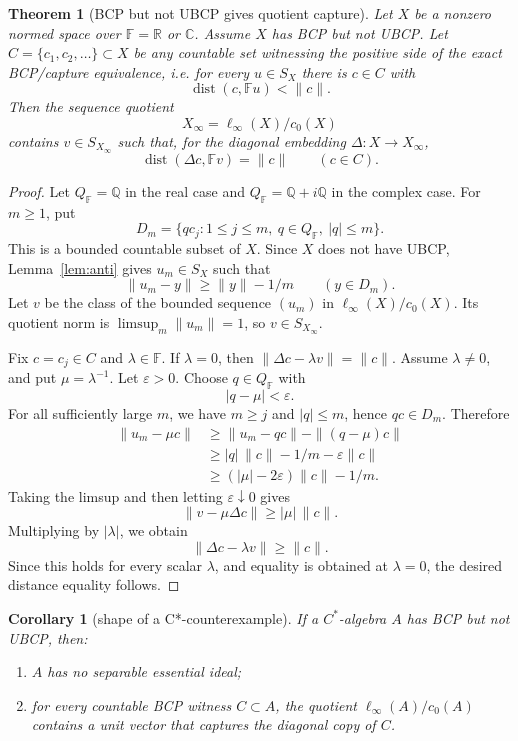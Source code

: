 \documentclass[11pt]{article}
\newtheorem{theorem}{Theorem}
\newtheorem{corollary}{Corollary}
\newcommand{\F}{\mathbb F}
\newcommand{\dist}{\operatorname{dist}}
\newcommand{\diag}{\Delta}
\begin{document}
\begin{theorem}[BCP but not UBCP gives quotient capture]
\label{thm:quotient}
Let \(X\) be a nonzero normed space over \(\F=\mathbb R\) or \(\mathbb C\).
Assume \(X\) has BCP but not UBCP.  Let \(C=\{c_1,c_2,\ldots\}\subset X\) be
any countable set witnessing the positive side of the exact BCP/capture
equivalence, i.e. for every \(u\in S_X\) there is \(c\in C\) with
\[
        \dist(c,\F u)<\|c\|.
\]
Then the sequence quotient
\[
        X_\infty=\ell_\infty(X)/c_0(X)
\]
contains \(v\in S_{X_\infty}\) such that, for the diagonal embedding
\(\diag:X\to X_\infty\),
\[
        \dist(\diag c,\F v)=\|c\| \qquad(c\in C).
\]
\end{theorem}

\begin{proof}
Let \(Q_\F=\mathbb Q\) in the real case and
\(Q_\F=\mathbb Q+i\mathbb Q\) in the complex case.  For \(m\ge1\), put
\[
        D_m=\{q c_j:1\le j\le m,\ q\in Q_\F,\ |q|\le m\}.
\]
This is a bounded countable subset of \(X\).  Since \(X\) does not have UBCP,
Lemma~\ref{lem:anti} gives \(u_m\in S_X\) such that
\[
        \|u_m-y\|\ge \|y\|-1/m \qquad(y\in D_m).
\]
Let \(v\) be the class of the bounded sequence \((u_m)\) in
\(\ell_\infty(X)/c_0(X)\).  Its quotient norm is
\(\limsup_m\|u_m\|=1\), so \(v\in S_{X_\infty}\).

Fix \(c=c_j\in C\) and \(\lambda\in\F\).  If \(\lambda=0\), then
\(\|\diag c-\lambda v\|=\|c\|\).  Assume \(\lambda\ne0\), and put
\(\mu=\lambda^{-1}\).  Let \(\varepsilon>0\).  Choose \(q\in Q_\F\) with
\[
        |q-\mu|<\varepsilon .
\]
For all sufficiently large \(m\), we have \(m\ge j\) and \(|q|\le m\), hence
\(qc\in D_m\).  Therefore
\[
\begin{aligned}
        \|u_m-\mu c\|
        &\ge \|u_m-qc\|-\|(q-\mu)c\|\\
        &\ge |q|\,\|c\|-1/m-\varepsilon\|c\|\\
        &\ge (|\mu|-2\varepsilon)\|c\|-1/m .
\end{aligned}
\]
Taking the limsup and then letting \(\varepsilon\downarrow0\) gives
\[
        \|v-\mu\diag c\|\ge |\mu|\,\|c\|.
\]
Multiplying by \(|\lambda|\), we obtain
\[
        \|\diag c-\lambda v\|\ge \|c\|.
\]
Since this holds for every scalar \(\lambda\), and equality is obtained at
\(\lambda=0\), the desired distance equality follows.
\end{proof}

\begin{corollary}[shape of a C*-counterexample]
\label{cor:shape}
If a \(C^*\)-algebra \(A\) has BCP but not UBCP, then:
\begin{enumerate}
    \item \(A\) has no separable essential ideal;
    \item for every countable BCP witness \(C\subset A\), the quotient
          \(\ell_\infty(A)/c_0(A)\) contains a unit vector that captures the
          diagonal copy of \(C\).
\end{enumerate}
\end{corollary}
\end{document}
